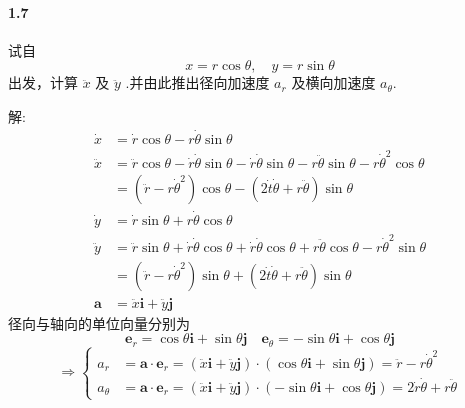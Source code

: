 \documentclass[UTF8,a4paper]{ctexart}
\begin{document}
\paragraph{1.7} 试自 \[ x = r \cos \theta , \quad y = r \sin \theta\] 出发，计算 $ \ddot{x} $ 及 $ \ddot{y} $ .并由此推出径向加速度 $ a_r $ 及横向加速度 $ a_\theta $.
\par 解:
\begin{equation*}
	\begin{aligned}
	\dot{x} &= \dot{r} \cos \theta - r \dot{\theta} \sin \theta \\
	\ddot{x} &= \ddot{r} \cos \theta - \dot{r} \dot{\theta} \sin \theta - \dot{r} \dot{\theta} \sin \theta - r \ddot{\theta} \sin \theta - r \dot{\theta}^2 \cos \theta \\
	&= \left( \ddot{r} - r \dot{\theta}^2 \right) \cos \theta - \left( 2 \dot{t} \dot{\theta} + r\ddot{\theta} \right) \sin \theta \\
	\dot{y} &= \dot{r} \sin \theta + r \dot{\theta} \cos \theta \\
	\ddot{y} &= \ddot{r} \sin \theta + \dot{r} \dot{\theta} \cos \theta + \dot{r} \dot{\theta} \cos \theta + r \ddot{\theta} \cos \theta - r \dot{\theta}^2 \sin \theta \\
	&= \left( \ddot{r} - r \dot{\theta}^2 \right) \sin \theta + \left(2 \dot{t} \dot{\theta} + r\ddot{\theta} \right) \sin \theta \\
	\boldsymbol{a} &= \ddot{x} \boldsymbol{i} + \ddot{y} \boldsymbol{j}
	\end{aligned}
\end{equation*}
径向与轴向的单位向量分别为
\begin{equation*}
	\boldsymbol{e}_r = \cos \theta \boldsymbol{i} + \sin \theta \boldsymbol{j} \quad
	\boldsymbol{e}_\theta = -\sin \theta \boldsymbol{i} + \cos \theta \boldsymbol{j}
\end{equation*}
\begin{equation*}
	\Rightarrow
	\left\{
	\begin{aligned}
	a_r &= \boldsymbol{a} \cdot \boldsymbol{e}_r 
	= \left( \ddot{x} \boldsymbol{i} + \ddot{y} \boldsymbol{j} \right) \cdot \left( \cos \theta \boldsymbol{i} + \sin \theta \boldsymbol{j} \right) 
	= \ddot{r} - r \dot{\theta}^2 \\
	a_\theta &= \boldsymbol{a} \cdot \boldsymbol{e}_r 
	= \left( \ddot{x} \boldsymbol{i} + \ddot{y} \boldsymbol{j} \right) \cdot \left( -\sin \theta \boldsymbol{i} + \cos \theta \boldsymbol{j} \right)
	= 2 \dot{r} \dot{\theta} + r \ddot{\theta}
	\end{aligned}
	\right.
\end{equation*}
\end{document}
